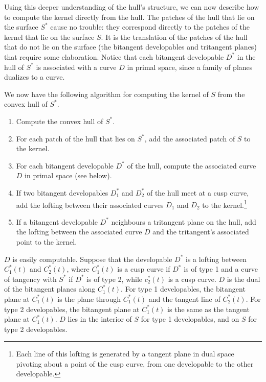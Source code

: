 \documentclass{elsart}
\begin{document}
Using this deeper understanding of the hull's structure,
we can now describe how to compute the kernel directly from the hull.
The patches of the hull that lie on the surface $S^*$
cause no trouble: they correspond directly
to the patches of the kernel that lie on the surface $S$.
It is the translation of the patches of the hull that do not lie on the surface 
(the bitangent developables and tritangent planes)
that require some elaboration.
Notice that each bitangent developable $D^*$ in the hull of $S^*$ 
is associated with a curve $D$ in primal space, since a family of planes dualizes to a curve.

We now have the following algorithm for computing the kernel of $S$ 
from the convex hull of $S^*$.

\begin{enumerate}
\item Compute the convex hull of $S^*$.
\item For each patch of the hull that lies on $S^*$, add the associated patch of $S$
	to the kernel.
\item For each bitangent developable $D^*$ of the hull, compute the associated curve $D$ in primal space
  (see below).
\item If two bitangent developables $D_1^*$ and $D_2^*$ of the hull meet at a cusp curve, 
  add the lofting between their associated curves $D_1$ and $D_2$ to the kernel.\footnote{
    Each line of this lofting is generated by a tangent plane in dual space pivoting 
    about a point of the cusp curve, from one developable to the other developable.}
\item If a bitangent developable $D^*$ neighbours a tritangent plane on the hull,
	add the lofting between the associated curve $D$ and the tritangent's 
	associated point to the kernel.
\end{enumerate}

%
%
$D$ is easily computable.
Suppose that the developable $D^*$ is a lofting between $C^*_1(t)$ and $C^*_2(t)$,
where $C^*_1(t)$ is a cusp curve if $D^*$ is of type 1 and
a curve of tangency with $S^*$ if $D^*$ is of type 2,
while $c^*_2(t)$ is a cusp curve.
$D$ is the dual of the bitangent planes along $C^*_1(t)$.
For type 1 developables, the bitangent plane at $C^*_1(t)$ is the plane through
$C^*_1(t)$ and the tangent line of $C^*_2(t)$.
%  
%  
For type 2 developables, the bitangent plane at $C^*_1(t)$ is the same as the tangent plane
at $C^*_1(t)$.
$D$ lies in the interior of $S$ for type 1 developables,
and on $S$ for type 2 developables.
\end{document}
